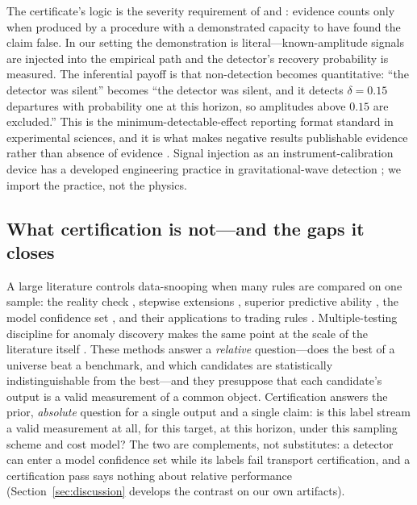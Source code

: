 \documentclass[3p]{elsarticle}
\begin{document}
The certificate's logic is the severity requirement of
\citet{Mayo2018} and \citet{MayoSpanos2006}: evidence counts only when
produced by a procedure with a demonstrated capacity to have found the claim
false. In our setting the demonstration is literal---known-amplitude signals
are injected into the empirical path and the detector's recovery probability
is measured. The inferential payoff is that non-detection becomes
quantitative: ``the detector was silent'' becomes ``the detector was silent,
and it detects $\delta=0.15$ departures with probability one at this horizon,
so amplitudes above $0.15$ are excluded.'' This is the minimum-detectable-effect
reporting format standard in experimental sciences, and it is what makes
negative results publishable evidence rather than absence of evidence
\citep{Harvey2017,HouXueZhang2020}. Signal injection as an instrument-calibration
device has a developed engineering practice in gravitational-wave detection
\citep{Biwer2017}; we import the practice, not the physics.

\subsection{What certification is not---and the gaps it closes}
\label{sec:not-comparison}

A large literature controls data-snooping when many rules are compared on one
sample: the reality check \citep{White2000}, stepwise extensions
\citep{RomanoWolf2005}, superior predictive ability \citep{Hansen2005}, the
model confidence set \citep{HansenLundeNason2011}, and their applications to
trading rules \citep{SullivanTimmermannWhite1999}. Multiple-testing discipline
for anomaly discovery makes the same point at the scale of the literature
itself \citep{HarveyLiuZhu2016,Bailey2016}. These methods answer a
\emph{relative} question---does the best of a universe beat a benchmark, and
which candidates are statistically indistinguishable from the best---and they
presuppose that each candidate's output is a valid measurement of a common
object. Certification answers the prior, \emph{absolute} question for a
single output and a single claim: is this label stream a valid measurement at
all, for this target, at this horizon, under this sampling scheme and cost
model? The two are complements, not substitutes: a detector can enter a model
confidence set while its labels fail transport certification, and a
certification pass says nothing about relative performance
(Section~\ref{sec:discussion} develops the contrast on our own artifacts).
\end{document}
